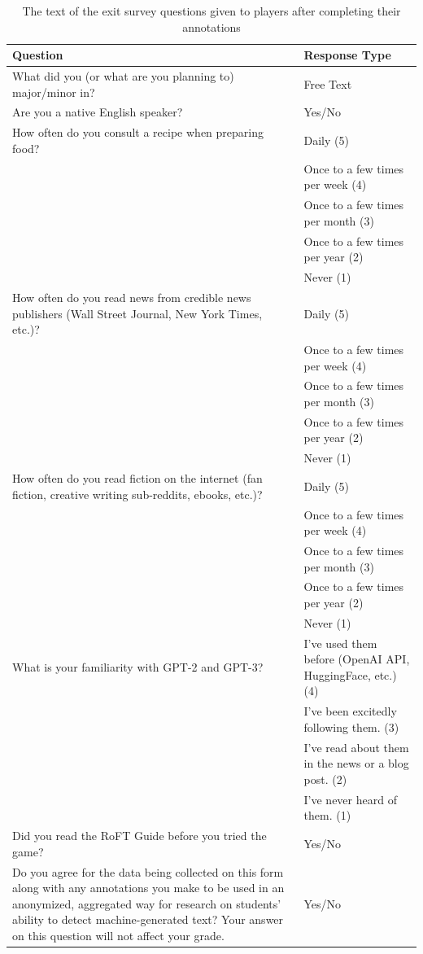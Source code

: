 \begin{table}
    \centering
    \small
    \begin{tabular}{p{3in}|l}
    \toprule
    Question & Response Type \\
    \midrule
    What did you (or what are you planning to) major/minor in? & Free Text \\\midrule
    Are you a native English speaker? & Yes/No \\\midrule
    How often do you consult a recipe when preparing food? & Daily (5) \\
    & Once to a few times per week (4) \\
    & Once to a few times per month (3) \\
    & Once to a few times per year (2) \\
    & Never (1) \\\midrule
    How often do you read news from credible news publishers (Wall Street Journal, New York Times, etc.)? & Daily (5) \\
    & Once to a few times per week (4) \\
    & Once to a few times per month (3) \\
    & Once to a few times per year (2) \\
    & Never (1) \\\midrule
    How often do you read fiction on the internet (fan fiction, creative writing sub-reddits, ebooks, etc.)? & Daily (5) \\
    & Once to a few times per week (4) \\
    & Once to a few times per month (3) \\
    & Once to a few times per year (2) \\
    & Never (1) \\\midrule
    What is your familiarity with GPT-2 and GPT-3? & I’ve used them before (OpenAI API, HuggingFace, etc.) (4) \\ 
    & I’ve been excitedly following them. (3) \\
    & I've read about them in the news or a blog post. (2) \\
    & I've never heard of them. (1) \\\midrule
    Did you read the RoFT Guide before you tried the game? & Yes/No \\\midrule
    Do you agree for the data being collected on this form along with any annotations you make to be used in an anonymized, aggregated way for research on students' ability to detect machine-generated text? Your answer on this question will not affect your grade. & Yes/No \\
    \bottomrule
    \end{tabular}
    \caption{The text of the exit survey questions given to players after completing their annotations}
    \label{tab:survey_questions}
\end{table}

